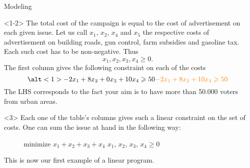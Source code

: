 \documentclass[32pt, aspectratio = 169]{beamer}
\begin{document}
\begin{frame}{Modeling}
    \begin{onlyenv}<1-2>
      The total cost of the campaign is equal to the cost of
      advertisement on each given issue. Let us call $x_1$, $x_2$,
      $x_4$ and $x_5$ the respective costs of advertisement on building
      roads, gun control, farm subsidies and gasoline tax. Each such
      cost has to be non-negative. Thus
        \begin{equation}
            \label{eq:positivityCondition}
            x_1, x_2, x_3, x_4 \geqslant 0.
        \end{equation}
        The first column gives the following constraint on each of the
        costs
        \begin{equation}
            \alt<1>{-2x_1 + 8x_2 + 0x_3 + 10x_4 \geqslant 50}{\textcolor{orange}{-2x_1 + 8x_2 + 10x_4 \geqslant 50}}
        \end{equation}
        The LHS corresponds to the fact your aim is to have more than
        50.000 voters from urban areas.
    \end{onlyenv}
    \begin{onlyenv}<3>
      Each one of the table's columns gives such a linear constraint
      on the set of costs. One can sum the issue at hand in the
      following way:
        \begin{figure}
            \begin{linearProg}{
                minimize
                }{
                $x_1+x_2+x_3+x_4$
                }{
                }{
                $x_1$, $x_2$, $x_3$, $x_4 \geq 0$
                }
            \end{linearProg}
        \end{figure}
    This is now our first example of a linear program.
    \end{onlyenv}
\end{frame}
\end{document}
